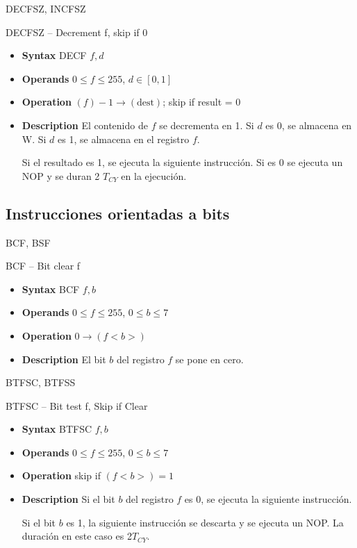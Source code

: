 \documentclass[xcolor=dvipsnames,handout]{beamer}
\begin{document}
\begin{frame}{DECFSZ, INCFSZ}
   \begin{block}{DECFSZ -- Decrement f, skip if 0}
      \begin{itemize}
	\item\textbf{Syntax} DECF $f, d$
	\item\textbf{Operands} $0\leq f\leq 255$, $d\in [0,1]$
	\item\textbf{Operation} $(f)-1\rightarrow (\textrm{dest})$; skip if result = 0
	\item\textbf{Description} El contenido de $f$ se decrementa en 1. Si $d$ es 0, se almacena en W. Si $d$ es 1, se almacena en el registro $f$. 

	Si el resultado es 1, se ejecuta la siguiente instrucción. Si es 0 se ejecuta un NOP y se duran 2 $T_{CY}$ en la ejecución.
      \end{itemize}      
  \end{block}

\end{frame}



\subsection[Bits]{Instrucciones orientadas a bits}  %

\begin{frame}{BCF, BSF}
   \begin{block}{BCF -- Bit clear f}
      \begin{itemize}
	\item\textbf{Syntax} BCF $f, b$
	\item\textbf{Operands} $0\leq f\leq 255$, $0\leq b\leq 7$
	\item\textbf{Operation} $0\rightarrow (f<b>)$
	\item\textbf{Description} El bit $b$ del registro $f$ se pone en cero.
      \end{itemize}      
  \end{block}
\end{frame}

\begin{frame}{BTFSC, BTFSS}
   \begin{block}{BTFSC -- Bit test f, Skip if Clear}
      \begin{itemize}
	\item\textbf{Syntax} BTFSC $f, b$
	\item\textbf{Operands} $0\leq f\leq 255$, $0\leq b\leq 7$
	\item\textbf{Operation} skip if $(f<b>)=1$
	\item\textbf{Description} Si el bit $b$ del registro $f$ es 0, se ejecuta la siguiente instrucción.

	Si el bit $b$ es 1, la siguiente instrucción se descarta y se ejecuta un NOP. La duración en este caso es 2$T_{CY}$.
      \end{itemize}      
  \end{block}

\end{frame}
\end{document}
